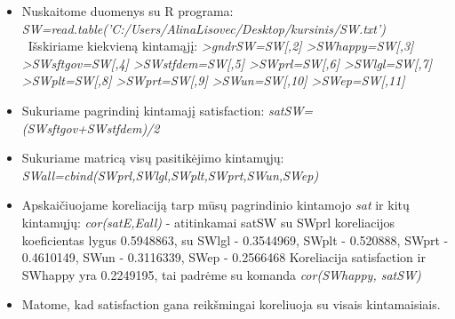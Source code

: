 \documentclass[a4paper]{article}
\begin{document}
\begin{enumerate}
\begin{itemize}
\item Nuskaitome duomenys su R programa: 
\newline
\textit {SW=read.table('C:/Users/AlinaLisovec/Desktop/kursinis/SW.txt')}
\ Išskiriame kiekvieną kintamąjį:
\newline
\textit {>gndrSW=SW[,2] 
\newline >SWhappy=SW[,3] 
\newline >SWsftgov=SW[,4]
\newline >SWstfdem=SW[,5]
\newline >SWprl=SW[,6]
\newline >SWlgl=SW[,7]
\newline >SWplt=SW[,8]
\newline >SWprt=SW[,9]
\newline >SWun=SW[,10]
\newline >SWep=SW[,11]}

\item Sukuriame pagrindinį kintamajį satisfaction:
\newline 
\textit{satSW=(SWsftgov+SWstfdem)/2}
\item Sukuriame matricą visų pasitikėjimo kintamųjų:
\newline \textit {SWall=cbind(SWprl,SWlgl,SWplt,SWprt,SWun,SWep)}
\item Apskaičiuojame koreliaciją tarp mūsų pagrindinio kintamojo \textit{sat} ir kitų kintamųjų:
\newline  \textit{cor(satE,Eall)}  -  atitinkamai satSW su SWprl koreliacijos koeficientas lygus 0.5948863,  su  SWlgl - 0.3544969,  SWplt - 0.520888, SWprt - 0.4610149, SWun - 0.3116339, SWep - 0.2566468
\newline Koreliacija satisfaction ir  SWhappy yra 0.2249195, tai padrėme su komanda 
\newline \textit{cor(SWhappy, satSW)}
\item Matome, kad satisfaction gana reikšmingai koreliuoja su visais kintamaisiais.


\end{itemize}
\end{enumerate}
\end{document}
